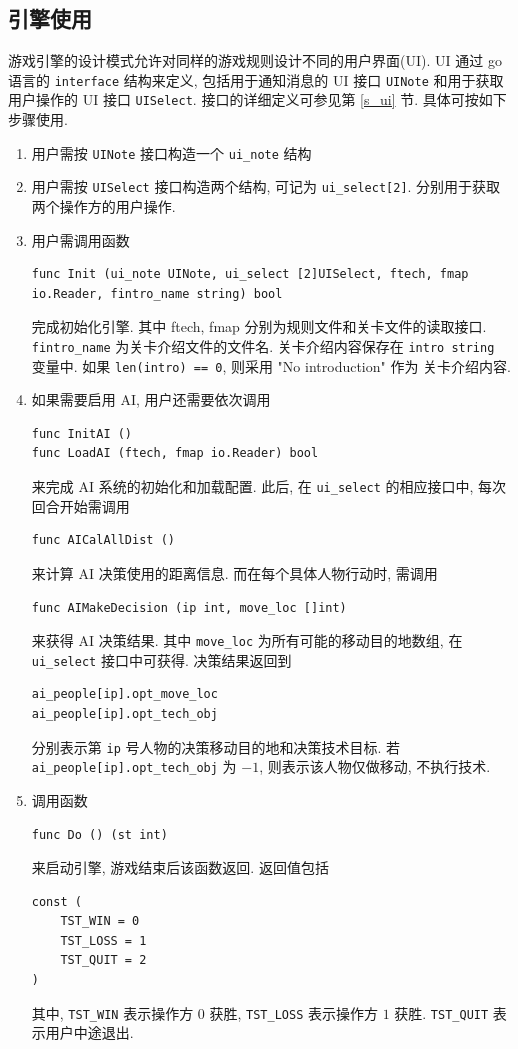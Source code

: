 \documentclass[UTF8, zihao=-4]{ctexart} %
\newcommand{\lcode}{\lstinline} % 段内插入代码
\begin{document}
\subsection{引擎使用}
游戏引擎的设计模式允许对同样的游戏规则设计不同的用户界面(UI). UI 通过 go 语言的 \lcode{interface} 结构来定义,
包括用于通知消息的 UI 接口 \lcode{UINote} 和用于获取用户操作的 UI 接口 \lcode{UISelect}.
接口的详细定义可参见第 \ref{s_ui} 节.
具体可按如下步骤使用.
\begin{enumerate}
      \item 用户需按 \lcode{UINote} 接口构造一个 \lcode{ui_note} 结构
      \item 用户需按 \lcode{UISelect} 接口构造两个结构, 可记为 \lcode{ui_select[2]}. 分别用于获取两个操作方的用户操作.
      \item 用户需调用函数
            \begin{lstlisting}
func Init (ui_note UINote, ui_select [2]UISelect, ftech, fmap io.Reader, fintro_name string) bool 
            \end{lstlisting}
            完成初始化引擎. 其中 ftech, fmap 分别为规则文件和关卡文件的读取接口. \lcode{fintro_name} 为关卡介绍文件的文件名.
            关卡介绍内容保存在 \lcode{intro string} 变量中. 如果 \lcode{len(intro) == 0}, 则采用 "No introduction" 作为
            关卡介绍内容.
      \item 如果需要启用 AI, 用户还需要依次调用
            \begin{lstlisting}
func InitAI ()
func LoadAI (ftech, fmap io.Reader) bool
            \end{lstlisting}
            来完成 AI 系统的初始化和加载配置. 此后, 在 \lcode{ui_select} 的相应接口中, 每次回合开始需调用
            \begin{lstlisting}
func AICalAllDist () 
            \end{lstlisting}
            来计算 AI 决策使用的距离信息.
            而在每个具体人物行动时, 需调用
            \begin{lstlisting}
func AIMakeDecision (ip int, move_loc []int)
            \end{lstlisting}
            来获得 AI 决策结果. 其中 \lcode{move_loc} 为所有可能的移动目的地数组, 在 \lcode{ui_select} 接口中可获得.
            决策结果返回到
            \begin{lstlisting}
ai_people[ip].opt_move_loc
ai_people[ip].opt_tech_obj
            \end{lstlisting}
            分别表示第 \lcode{ip} 号人物的决策移动目的地和决策技术目标. 若 \lcode{ai_people[ip].opt_tech_obj} 为 $-1$,
            则表示该人物仅做移动, 不执行技术.
      \item 调用函数  
            \begin{lstlisting}
func Do () (st int)
            \end{lstlisting}
            来启动引擎, 游戏结束后该函数返回. 返回值包括
            \begin{lstlisting}
const (
	TST_WIN = 0
	TST_LOSS = 1
	TST_QUIT = 2
)
            \end{lstlisting}
            其中, \lcode{TST_WIN} 表示操作方 $0$ 获胜, \lcode{TST_LOSS} 表示操作方 $1$ 获胜. \lcode{TST_QUIT} 表示用户中途退出.
\end{enumerate}
\end{document}
